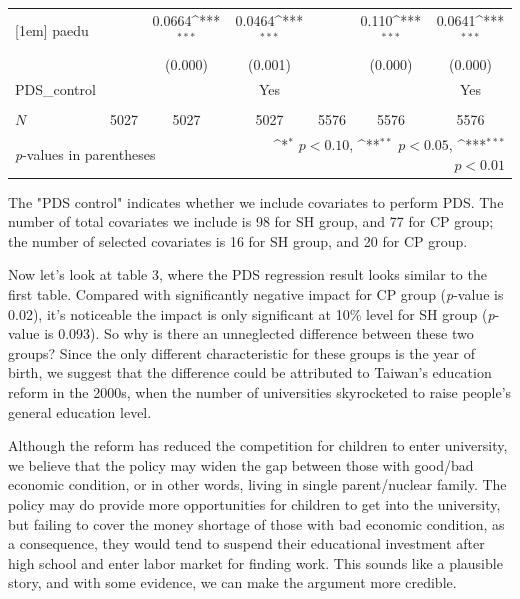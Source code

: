 \documentclass[]{AEA}
\def\sym#1{\ifmmode^{#1}\else\(^{#1}\)\fi}
\begin{document}
\begin{center}
\begin{table}
\begin{tabular}{l*{6}c}
    [1em]
    paedu       &                     &      0.0664\sym{***}&      0.0464\sym{***}&                     &       0.110\sym{***}&      0.0641\sym{***}\\
        &                     &     (0.000)         &     (0.001)         &                     &     (0.000)         &     (0.000)         \\
    [1em]
    PDS\_control  &   &  &  Yes    &  &    &  Yes \\
    &   &      &      &   &      &      \\
    \hline
    \(N\)       &        5027         &        5027         &        5027         &        5576         &        5576         &        5576         \\
    \bottomrule
    \multicolumn{3}{l}{\footnotesize \textit{p}-values in parentheses} & \multicolumn{4}{r}{\footnotesize \sym{*} \(p<0.10\), \sym{**} \(p<0.05\), \sym{***} \(p<0.01\)}\\
    \end{tabular}
    \begin{tablenotes}
        The "PDS control" indicates whether we include covariates to perform PDS.  The number of total covariates we include is 98 for SH group, and 77 for CP group; the number of selected covariates is 16 for SH group, and 20 for CP group.
    \end{tablenotes}
    \end{table}
    \end{center}

    Now let's look at table 3, where the PDS regression result looks similar to the first table.  Compared with significantly negative impact for CP group (\textit{p}-value is 0.02), it's noticeable the impact is only significant at 10\% level for SH group (\textit{p}-value is 0.093).  So why is there an unneglected difference between these two groups?  Since the only different characteristic for these groups is the year of birth, we suggest that the difference could be attributed to Taiwan's education reform in the 2000s, when the number of universities skyrocketed to raise people's general education level. 
    
    Although the reform has reduced the competition for children to enter university, we believe that the policy may widen the gap between those with good/bad economic condition, or in other words, living in single parent/nuclear family. The policy may do provide more opportunities for children to get into the university, but failing to cover the money shortage of those with bad economic condition, as a consequence, they would tend to suspend their educational investment after high school and enter labor market for finding work.  This sounds like a plausible story, and with some evidence, we can make the argument more credible.
\end{document}
